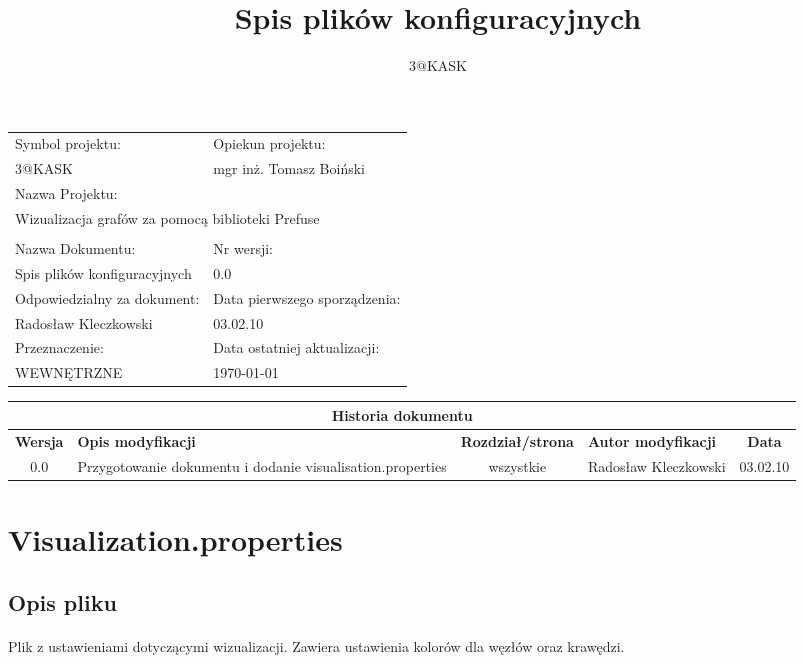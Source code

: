 \documentclass[a4paper,10pt]{article}
\title{Spis plików konfiguracyjnych}
\author{3@KASK}
\begin{document}



\maketitle


\begin{center}
\begin{tabular}{|p{7cm}|p{7cm}|}
\hline
Symbol projektu: & Opiekun projektu:   \tabularnewline
3@KASK & mgr inż. Tomasz Boiński    \tabularnewline \hline
\multicolumn{2}{|l|}{Nazwa Projektu: } \tabularnewline
\multicolumn{2}{|l|}{Wizualizacja grafów za pomocą biblioteki Prefuse } \tabularnewline
\hline
\multicolumn{2}{l}{ } \tabularnewline %
\hline
Nazwa Dokumentu: & Nr wersji:   \tabularnewline
Spis plików konfiguracyjnych & 0.0 \tabularnewline \hline
Odpowiedzialny za dokument: & Data pierwszego sporządzenia:   \tabularnewline
Radosław Kleczkowski & 03.02.10 \tabularnewline \hline
Przeznaczenie: & Data ostatniej aktualizacji:   \tabularnewline
WEWNĘTRZNE & \today \tabularnewline \hline
\end{tabular}
\end{center}

\begin{center}
\begin{tabular}{|c|p{4cm}|c|p{3cm}|c|}
\multicolumn{5}{c}{\textbf{Historia dokumentu}} \tabularnewline \hline
\textbf{Wersja} & \textbf{Opis modyfikacji} & \textbf{Rozdział/strona} & \textbf{Autor modyfikacji} & \textbf{Data} \tabularnewline \hline
0.0 & Przygotowanie dokumentu i dodanie visualisation.properties & wszystkie & Radosław Kleczkowski & 03.02.10 \tabularnewline \hline
\end{tabular}


\end{center}
\newpage
\tableofcontents
\newpage

\section{Visualization.properties}

\subsection{Opis pliku}
\paragraph{} Plik z ustawieniami dotyczącymi wizualizacji. Zawiera ustawienia kolorów dla węzłów oraz krawędzi.
\end{document}
